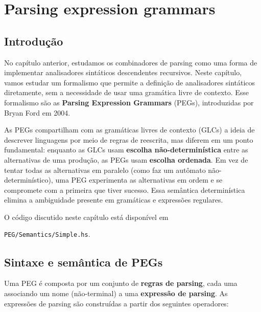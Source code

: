 \chapter{Parsing expression grammars}

\section{Introdução}

No capítulo anterior, estudamos os combinadores de parsing como uma
forma de implementar analisadores sintáticos descendentes recursivos.
Neste capítulo, vamos estudar um formalismo que permite a definição
de analisadores sintáticos diretamente, sem a necessidade de usar uma
gramática livre de contexto. Esse formalismo são as \textbf{Parsing
Expression Grammars} (PEGs), introduzidas por Bryan Ford em 2004.

As PEGs compartilham com as gramáticas livres de contexto (GLCs) a
ideia de descrever linguagens por meio de regras de reescrita, mas
diferem em um ponto fundamental: enquanto as GLCs usam
\textbf{escolha não-determinística} entre as alternativas de uma
produção, as PEGs usam \textbf{escolha ordenada}. Em vez de tentar
todas as alternativas em paralelo (como faz um autômato
não-determinístico), uma PEG experimenta as alternativas em ordem e
se compromete com a primeira que tiver sucesso. Essa semântica
determinística elimina a ambiguidade presente em gramáticas e
expressões regulares.

O código discutido neste capítulo está disponível em
\begin{flushleft}
  \verb|PEG/Semantics/Simple.hs|.
\end{flushleft}

\section{Sintaxe e semântica de PEGs}

Uma PEG é composta por um conjunto de \textbf{regras de parsing},
cada uma associando um nome (não-terminal) a uma \textbf{expressão de
parsing}. As expressões de parsing são construídas a partir dos
seguintes operadores:

